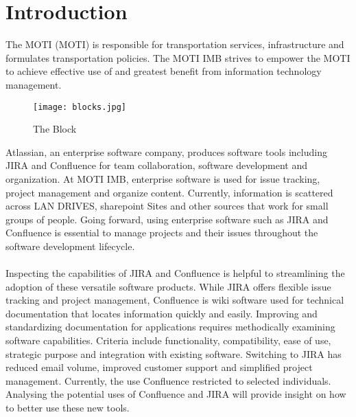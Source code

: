 \section{Introduction}
The \gls{MOTI} (MOTI) is responsible for transportation services, infrastructure and formulates transportation policies. The \gls{MOTI} \gls{IMB} strives to empower the \gls{MOTI} to achieve effective use of and greatest benefit from information technology management. \\ 

\begin{figure}[H]
\texttt{[image: blocks.jpg]}
\caption{The Block}
\end{figure}


Atlassian, an enterprise software company, produces software tools including \gls{JIRA} and Confluence for team collaboration, software development and organization. At MOTI IMB, enterprise software is used for issue tracking, project management and organize content. Currently, information is scattered across LAN DRIVES, \gls{sharepoint} Sites and other sources that work for small groups of people. Going forward, using enterprise software such as JIRA and Confluence is essential to manage projects and their issues throughout the software development lifecycle. 
\\ \\
Inspecting the capabilities of JIRA and Confluence is helpful to streamlining the adoption of these versatile software products. While JIRA offers flexible issue tracking and project management, Confluence is wiki software used for technical documentation that locates information quickly and easily. Improving and standardizing documentation for applications requires methodically examining software capabilities. Criteria include functionality, compatibility, ease of use, strategic purpose and integration with existing software. Switching to JIRA has reduced email volume, improved customer support and simplified project management. Currently, the use Confluence restricted to selected individuals. Analysing the potential uses of Confluence and JIRA will provide insight on how to better use these new tools.